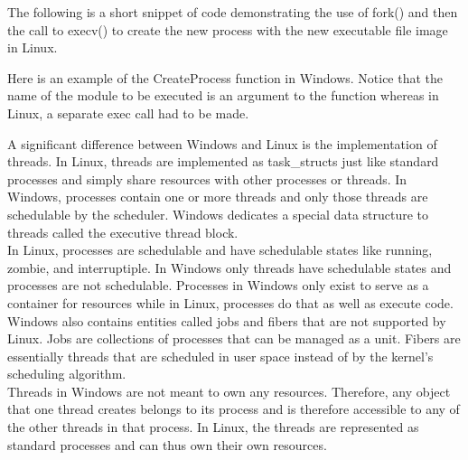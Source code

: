 \documentclass[letterpaper,10pt,titlepage]{article}
\begin{document}
The following is a short snippet of code demonstrating the use of fork() and
then the call to execv() to create the new process with the new executable
file image in Linux.



Here is an example of the CreateProcess function in Windows. Notice that the
name of the module to be executed is an argument to the function whereas in
Linux, a separate exec call had to be made.



A significant difference between Windows and Linux is the implementation of 
threads. In Linux, threads are implemented as task\_structs just like 
standard processes and simply share resources with other processes or threads.
In Windows, processes contain one or more threads and only those threads are
schedulable by the scheduler. Windows dedicates a special data structure to 
threads called the executive thread block. 
\\

In Linux, processes are schedulable and have schedulable states like running,
zombie, and interruptiple. In Windows only threads have schedulable states and
processes are not schedulable. Processes in Windows only exist to serve as a
container for resources while in Linux, processes do that as well as execute 
code.
\\

Windows also contains entities called jobs and fibers that are not supported 
by Linux. Jobs are collections of processes that can be managed as a unit.
Fibers are essentially threads that are scheduled in user space instead of
by the kernel's scheduling algorithm. 
\\

Threads in Windows are not meant to own any resources. Therefore, any object
that one thread creates belongs to its process and is therefore accessible to 
any of the other threads in that process. In Linux, the threads are represented
as standard processes and can thus own their own resources. 
\end{document}
